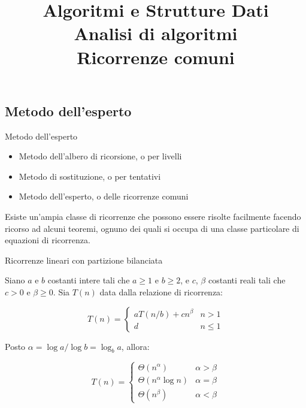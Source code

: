 \title[ASD - Analisi di algoritmi]{\textbf{Algoritmi e Strutture Dati}\\[18pt]Analisi di algoritmi\\Ricorrenze comuni}

\FrameTitle{}


\subsection{Metodo dell'esperto}


\begin{frame}{Metodo dell'esperto}

\begin{myboxtitle}
\begin{itemize}
\item Metodo dell'albero di ricorsione, o per livelli
\item Metodo di sostituzione, o per tentativi
\item \alert{Metodo dell'esperto, o delle ricorrenze comuni}
\end{itemize}
\end{myboxtitle}


\begin{myboxtitle}
Esiste un'ampia classe di ricorrenze che possono essere risolte facilmente 
facendo ricorso ad alcuni teoremi, ognuno dei quali si occupa di una classe
particolare di equazioni di ricorrenza.	
\end{myboxtitle}

\end{frame}

\begin{frame}{Ricorrenze lineari con partizione bilanciata}

\begin{myboxtitle}[Teorema]
Siano $a$ e $b$ costanti intere tali che $a \ge 1$ e $b \ge 2$, e $c$,
$\beta$ costanti reali tali che $c > 0$ e $\beta \ge 0$. Sia
$T(n)$ data dalla relazione di ricorrenza:

\[
T(n) = \begin{cases}
  aT(n/b) + cn^\beta & n>1 \\
  d & n \leq 1
\end{cases}
\]

Posto $\alpha = \log a / \log b = \log_b a$, allora:

\[
T(n) =\begin{cases}
\Theta(n^\alpha) & \alpha > \beta \\
\Theta(n^\alpha\log n) & \alpha = \beta \\
\Theta(n^\beta) & \alpha < \beta 
\end{cases}
\]
\end{myboxtitle}	
	
\end{frame}

